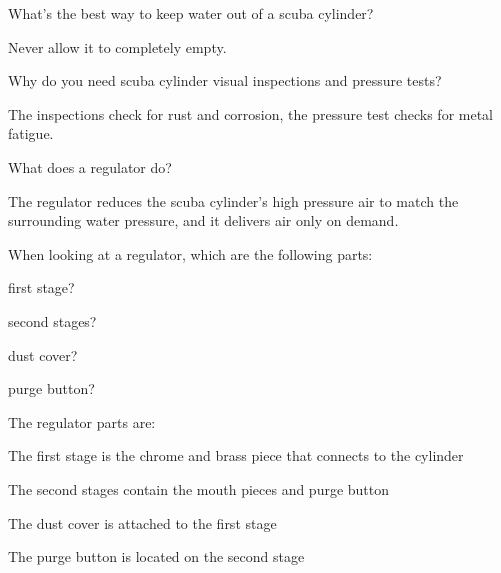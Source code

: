 	\begin{qanda}
		\begin{question}
What's the best way to keep water out of a scuba cylinder?
		\end{question}

		\begin{answer}
Never allow it to completely empty.
		\end{answer}
	\end{qanda}

	\begin{qanda}
		\begin{question}
Why do you need scuba cylinder visual inspections and pressure tests?
		\end{question}

		\begin{answer}
The inspections check for rust and corrosion, the pressure test checks for metal fatigue.
		\end{answer}
	\end{qanda}

	\begin{qanda}
		\begin{question}
What does a regulator do?
		\end{question}

		\begin{answer}
The regulator reduces the scuba cylinder's high pressure air to match the surrounding water pressure, and it delivers air only on demand.
		\end{answer}
	\end{qanda}

	\begin{qanda}
		\begin{question}
When looking at a regulator, which are the following parts:
			\begin{nospacebulletedlist}
				\item first stage?
				\item second stages?
				\item dust cover?
				\item purge button?
			\end{nospacebulletedlist}
		\end{question}

		\begin{answer}
The regulator parts are:
			\begin{nospacebulletedlist}
						\item The first stage is the chrome and brass piece that connects to the cylinder
						\item The second stages contain the mouth pieces and purge button
						\item The dust cover is attached to the first stage
						\item The purge button is located on the second stage
			\end{nospacebulletedlist}
		\end{answer}
	\end{qanda}

